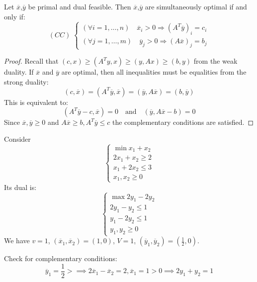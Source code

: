 \documentclass[../main.tex]{subfiles}
\begin{document}
\begin{theorem}
    Let $\overline{x}$,$\overline{y}$ be primal and dual feasible. Then $\overline{x}$,$\overline{y}$ are simultaneously optimal if and only if:
    \[
        (CC) \;
        \begin{cases}
            (\forall i = 1, \ldots, n) \quad \overline{x}_i > 0 \Rightarrow (A^T \overline{y})_i = c_i \\
            (\forall j = 1, \ldots, m) \quad \overline{y}_j > 0 \Rightarrow (A \overline{x})_j = b_j
        \end{cases}
    \]
\end{theorem}
\begin{proof}
    Recall that $(c,x) \geq (A^T y, x) \geq (y, Ax) \geq (b,y)$ from the weak duality. If $\overline{x}$ and $\overline{y}$ are optimal, then all inequalities must be equalities from the strong duality:
    \[
        (c,\overline{x}) = (A^T \overline{y}, \overline{x}) = (\overline{y}, A\overline{x}) = (b,\overline{y})
    \]
    This is equivalent to:
    \[
        (A^T \overline{y} - c, \overline{x}) = 0 \quad \text{and} \quad (\overline{y}, A\overline{x} - b) = 0
    \]
    Since $\overline{x}, \overline{y} \geq 0$ and $A \overline{x} \geq b, A^T \overline{y} \leq c$ the complementary conditions are satisfied.
\end{proof}
\begin{example}
    Consider
    \[
        \begin{cases}
            \min x_1 + x_2     \\
            2 x_1 + x_2 \geq 2 \\
            x_1 + 2 x_2 \leq 3 \\
            x_1, x_2 \geq 0
        \end{cases}
    \]
    Its dual is:
    \[
        \begin{cases}
            \max 2y_1 - 2y_2  \\
            2y_1 - y_2 \leq 1 \\
            y_1 - 2y_2 \leq 1 \\
            y_1, y_2 \geq 0
        \end{cases}
    \]
    We have $v = 1$, $(\overline{x}_1, \overline{x}_2) = (1,0)$, $V = 1$, $(\overline{y}_1, \overline{y}_2) = (\frac{1}{2},0)$.

    Check for complementary conditions:
    \[
        \overline{y}_1 = \frac{1}{2} > \implies 2 \overline{x}_1 - \overline{x}_2 = 2, \overline{x}_1 = 1 > 0 \implies 2 y_1 + y_2 = 1
    \]
\end{example}
\end{document}
